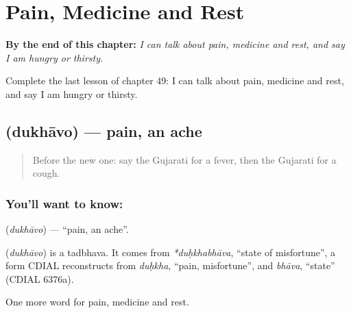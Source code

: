 
\chapter{Pain, Medicine and Rest}
\label{ch:gu-pain-medicine-and-rest}

\begin{chapteropening}
\textbf{By the end of this chapter:} \emph{I can talk about pain, medicine and rest, and say I am hungry or thirsty.}

Complete the last lesson of chapter 49: I can talk about pain, medicine and rest, and say I am hungry or thirsty.
\end{chapteropening}

\section[\texorpdfstring{\gu{દુખાવો} (dukhāvo)}{દુખાવો (dukhāvo)}]{ (dukhāvo) — pain, an ache}

\label{lesson:GU-C49-pain}



\begin{quote}
Before the new one: say the Gujarati for a fever, then the Gujarati for a cough.
\end{quote}

\subsection*{You'll want to know: }
\textbf{} (\emph{dukhāvo}) — \textquotedblleft{}pain, an ache\textquotedblright{}.

\begin{cousinweb}
\textbf{} (\emph{dukhāvo}) is a tadbhava. It comes from \emph{*duḥkhabhāva}, \textquotedblleft{}state of misfortune\textquotedblright{}, a form CDIAL reconstructs from \emph{duḥkha}, \textquotedblleft{}pain, misfortune\textquotedblright{}, and \emph{bhāva}, \textquotedblleft{}state\textquotedblright{} (CDIAL 6376a).
\end{cousinweb}

\begin{grammarlens}[title={What you've built}]
One more word for pain, medicine and rest.
\end{grammarlens}

